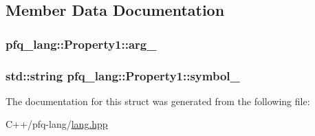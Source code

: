 \subsection{Member Data Documentation}
\hypertarget{structpfq__lang_1_1Property1_a65593e0522f2492c9d77e64dc73cbf9c}{
\subsubsection[{arg\+\_\+}]{ pfq\+\_\+lang\+::\+Property1\+::arg\+\_\+}}\label{structpfq__lang_1_1Property1_a65593e0522f2492c9d77e64dc73cbf9c}
\hypertarget{structpfq__lang_1_1Property1_aa4c4ac30609cd7e17f71dbdf9cf40608}{
\subsubsection[{symbol\+\_\+}]{\setlength{\rightskip}{0pt plus 5cm}std\+::string pfq\+\_\+lang\+::\+Property1\+::symbol\+\_\+}}\label{structpfq__lang_1_1Property1_aa4c4ac30609cd7e17f71dbdf9cf40608}


The documentation for this struct was generated from the following file\+:\begin{DoxyCompactItemize}
\item 
C++/pfq-\/lang/\hyperlink{lang_8hpp}{lang.\+hpp}\end{DoxyCompactItemize}
